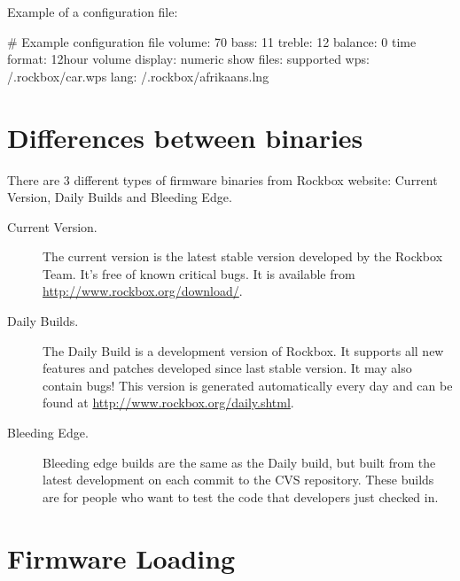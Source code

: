 Example of a configuration file:
\begin{example}
    # Example configuration file
    volume: 70
    bass: 11
    treble: 12
    balance: 0
    time format: 12hour
    volume display: numeric
    show files: supported
    wps: /.rockbox/car.wps
    lang: /.rockbox/afrikaans.lng
\end{example}

\section{\label{ref:PartISection1}Differences between binaries}
There are 3 different types of firmware binaries from Rockbox website: 
Current Version, Daily Builds and Bleeding Edge.

\begin{description}
\item[Current Version.] The current version is the latest stable version
developed by the Rockbox Team. It's free of known critical bugs.  It is
available from \url{http://www.rockbox.org/download/}.
\item[Daily Builds.] The Daily Build is a development version of Rockbox. It
supports all new features and patches developed since last stable version. It
may also contain bugs! This version is generated automatically every day 
and can be found at \url{http://www.rockbox.org/daily.shtml}.
\item[Bleeding Edge.] Bleeding edge builds are the same as the Daily build, 
but built from the latest development on each commit to the CVS repository.
These builds are for people who want to test the code that developers just
checked in.
\end{description}


\section{\label{ref:FirmwareLoading}Firmware Loading}

